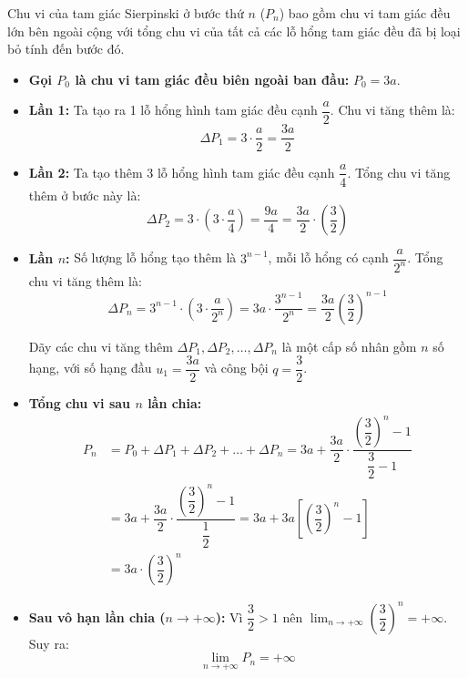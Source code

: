\documentclass[12pt,a4paper,oneside]{book}
\theoremstyle{theorem}
\theoremstyle{definition}
\begin{document}
    \noindent Chu vi của tam giác Sierpinski ở bước thứ $n$ ($P_n$) bao gồm chu vi tam giác đều lớn bên ngoài cộng với tổng chu vi của tất cả các lỗ hổng tam giác đều đã bị loại bỏ tính đến bước đó.

    \begin{itemize}
    \item \textbf{Gọi $P_0$ là chu vi tam giác đều biên ngoài ban đầu:} $P_0 = 3a$.


    \item \textbf{Lần 1:} Ta tạo ra 1 lỗ hổng hình tam giác đều cạnh $\dfrac{a}{2}$. Chu vi tăng thêm là:
    \[
    \Delta P_1 = 3 \cdot \dfrac{a}{2} = \dfrac{3a}{2}
    \]


    \item \textbf{Lần 2:} Ta tạo thêm 3 lỗ hổng hình tam giác đều cạnh $\dfrac{a}{4}$. Tổng chu vi tăng thêm ở bước này là:
    \[
    \Delta P_2 = 3 \cdot \left(3 \cdot \dfrac{a}{4}\right) = \dfrac{9a}{4} = \dfrac{3a}{2} \cdot \left(\dfrac{3}{2}\right)
    \]


    \item \textbf{Lần $n$:} Số lượng lỗ hổng tạo thêm là $3^{n-1}$, mỗi lỗ hổng có cạnh $\dfrac{a}{2^n}$. Tổng chu vi tăng thêm là:
    \[
    \Delta P_n = 3^{n-1} \cdot \left(3 \cdot \dfrac{a}{2^n}\right) = 3a \cdot \dfrac{3^{n-1}}{2^n} = \dfrac{3a}{2} \left(\dfrac{3}{2}\right)^{n-1}
    \]

    Dãy các chu vi tăng thêm $\Delta P_1, \Delta P_2, \dots, \Delta P_n$ là một cấp số nhân gồm $n$ số hạng, với số hạng đầu $u_1 = \dfrac{3a}{2}$ và công bội $q = \dfrac{3}{2}$.

    \item \textbf{Tổng chu vi sau $n$ lần chia:}
    \begin{align*}
    P_n &= P_0 + \Delta P_1 + \Delta P_2 + \dots + \Delta P_n = 3a + \dfrac{3a}{2} \cdot \dfrac{\left(\dfrac{3}{2}\right)^n - 1}{\dfrac{3}{2} - 1} \\
        &= 3a + \dfrac{3a}{2} \cdot \dfrac{\left(\dfrac{3}{2}\right)^n - 1}{\dfrac{1}{2}} = 3a + 3a \left[\left(\dfrac{3}{2}\right)^n - 1\right] \\
        &= 3a \cdot \left(\dfrac{3}{2}\right)^n
    \end{align*}
    \item \textbf{Sau vô hạn lần chia ($n \to +\infty$):} Vì $\dfrac{3}{2} > 1$ nên $\displaystyle \lim_{n \to +\infty} \left(\dfrac{3}{2}\right)^n = +\infty$. Suy ra:
    \[
    \lim_{n \to +\infty} P_n = +\infty
    \]
    \end{itemize}
\end{document}
